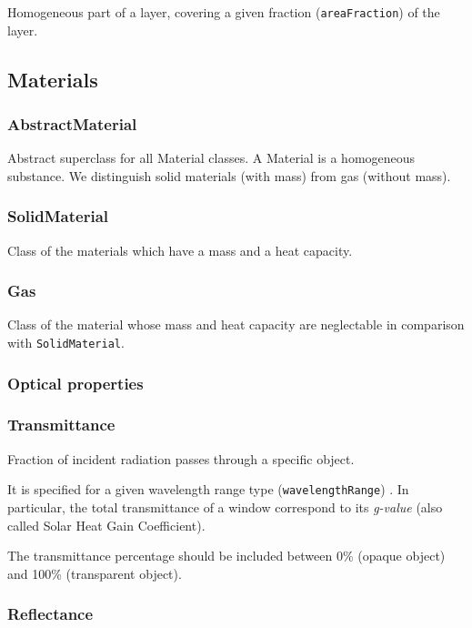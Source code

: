 \documentclass[a4paper,12pt]{article}
\begin{document}
Homogeneous part of a layer, covering a given fraction
(\texttt{areaFraction}) of the layer.

\subsection{Materials}\label{materials}

\subsubsection{AbstractMaterial}\label{abstractmaterial}

Abstract superclass for all Material classes. A Material is a
homogeneous substance. We distinguish solid materials (with mass) from
gas (without mass).

\subsubsection{SolidMaterial}\label{solidmaterial}

Class of the materials which have a mass and a heat capacity.

\subsubsection{Gas}\label{gas}

Class of the material whose mass and heat capacity are neglectable in
comparison with \texttt{SolidMaterial}.

\subsubsection{Optical properties}\label{optical-properties}

\subsubsection{Transmittance}\label{transmittance}

Fraction of incident radiation passes through a specific object.

It is specified for a given wavelength range type
(\texttt{wavelengthRange}) . In particular, the total transmittance of a
window correspond to its \emph{g-value} (also called Solar Heat Gain
Coefficient).

The transmittance percentage should be included between 0\% (opaque
object) and 100\% (transparent object).

\subsubsection{Reflectance}\label{reflectance}
\end{document}
